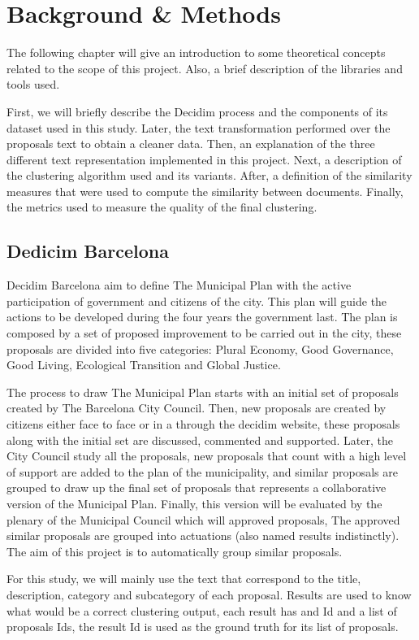 \chapter{Background \& Methods}

The following chapter will give an introduction to some theoretical concepts related to the scope of this project. Also, a brief description of the libraries and tools used.

First, we will briefly describe the Decidim process and the components of its dataset used in this study. Later, the text transformation performed over the proposals text to obtain a cleaner data. Then, an explanation of the three different text representation implemented in this project. Next, a description of the clustering algorithm used and its variants. After, a definition of the similarity measures that were used to compute the similarity between documents. Finally, the metrics used to measure the quality of the final clustering.

\section{Dedicim Barcelona}
Decidim Barcelona aim to define The Municipal Plan with the active participation of government and citizens of the city. This plan will guide the actions to be developed during the four years the government last. The plan is composed by a set of proposed improvement to be carried out in the city, these proposals are divided into five categories: Plural Economy, Good Governance, Good Living, Ecological Transition and Global Justice. 

The process to draw The Municipal Plan starts with an initial set of proposals created by The Barcelona City Council. Then, new proposals are created by citizens either face to face or in a through the decidim website, these proposals along with the initial set are discussed, commented and supported. Later, the City Council study all the proposals, new proposals that count with a high level of support are added to the plan of the municipality, and similar proposals are grouped to draw up the final set of proposals that represents a collaborative version of the Municipal Plan. Finally, this version will be evaluated by the plenary of the Municipal Council which will approved proposals, The approved similar proposals are grouped into actuations (also named results indistinctly). The aim of this project is to automatically group similar proposals.

For this study, we will mainly use the text that correspond to the title, description, category and subcategory of each proposal. Results are used to know what would be a correct clustering output, each result has and Id and a list of proposals Ids, the result Id is used as the ground truth for its list of proposals.

